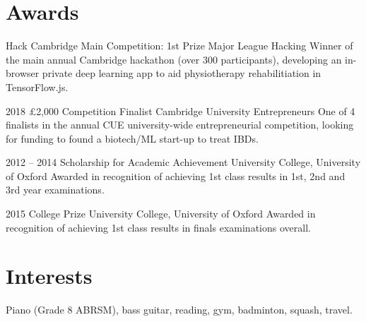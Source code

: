 \documentclass[]{friggeri-cv} %
\begin{document}

\section{Awards}

\begin{entrylist}
	
    {Hack Cambridge Main Competition: 1st Prize}
    {Major League Hacking}
    {Winner of the main annual Cambridge hackathon (over 300 participants), developing an in-browser private deep learning app to aid physiotherapy rehabilitiation in TensorFlow.js.}
	
    \entrysmall
    {2018}
    {£2,000 Competition Finalist}
    {Cambridge University Entrepreneurs}
    {One of 4 finalists in the annual CUE university-wide entrepreneurial competition, looking for
    funding to found a biotech/ML start-up to treat IBDs.}
    	
	\entrysmall
	{2012 -- 2014}
	{Scholarship {\normalfont for Academic Achievement}}
	{University College, University of Oxford}
	{Awarded in recognition of achieving 1st class results in 1st, 2nd and 3rd year examinations.}
	
	\entrysmall
	{2015}
	{College Prize}
	{University College, University of Oxford}
	{Awarded in recognition of achieving 1st class results in finals examinations overall.}
	
	
\end{entrylist}


\section{Interests}

Piano (Grade 8 ABRSM), bass guitar, reading, gym, badminton, squash, travel.


\iffalse
\end{document}
